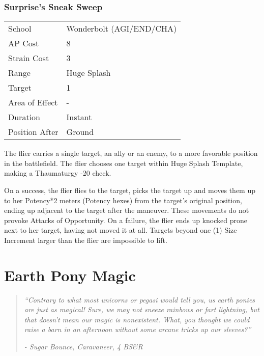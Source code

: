 \documentclass[11pt,a4paper,twocolumn]{book}
\begin{document}
\subsection*{Surprise's Sneak Sweep}
{
	\begin{tabu} to 75mm{| X[l,4] | X[l,7] |}
		\hline
		School 			& Wonderbolt (AGI/END/CHA)		\\
		AP Cost	      	& 8 				\\
		Strain Cost     & 3 				\\
		Range     		& Huge Splash		\\
		Target      	& 1 				\\
		Area of Effect  & - 	 			\\
		Duration     	& Instant 	 		\\
		Position After  & Ground 			\\ \hline
	\end{tabu}
	
}

\medskip

The flier carries a single target, an ally or an enemy, to a more favorable position in the battlefield. The flier chooses one target within Huge Splash Template, making a Thaumaturgy -20 check.

On a success, the flier flies to the target, picks the target up and moves them up to her Potency*2 meters (Potency hexes) from the target's original position, ending up adjacent to the target after the maneuver. These movements do not provoke Attacks of Opportunity. On a failure, the flier ends up knocked prone next to her target, having not moved it at all. Targets beyond one (1) Size Increment larger than the flier are impossible to lift.

\chapter{Earth Pony Magic}
\begin{quote}
	\emph{``Contrary to what most unicorns or pegasi would tell you, us earth ponies are just as magical! Sure, we may not sneeze rainbows or fart lightning, but that doesn't mean our magic is nonexistent. What, you thought we could raise a barn in an afternoon without some arcane tricks up our sleeves?''}
	
	\emph{- Sugar Bounce, Caravaneer, 4 BS\&R}
\end{quote}
\end{document}
